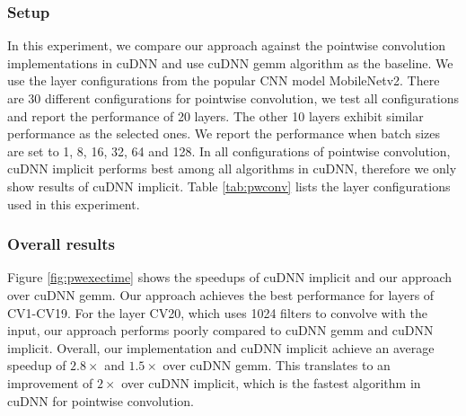 \subsubsection{Setup} In this experiment, we compare our approach against the pointwise convolution implementations in cuDNN and use cuDNN gemm algorithm as the baseline. 
We use the layer configurations from the popular CNN model MobileNetv2.
There are 30 different configurations for pointwise convolution, we test all configurations and report the performance of 20 layers. 
The other 10 layers exhibit similar performance as the selected ones.  
We report the performance when batch sizes are set to 1, 8, 16, 32, 64 and 128.
In all configurations of pointwise convolution, cuDNN implicit performs best among all algorithms in cuDNN, therefore we only show results of cuDNN implicit.
Table \ref{tab:pwconv} lists the layer configurations used in this experiment.

\subsubsection{Overall results} Figure \ref{fig:pwexectime} shows the speedups of cuDNN implicit and our approach over cuDNN gemm.
Our approach achieves the best performance for layers of CV1-CV19.
For the layer CV20, which uses 1024 filters to convolve with the input, our approach performs poorly compared to cuDNN gemm and cuDNN implicit.
Overall, our implementation and cuDNN implicit achieve an average speedup of $2.8\times$ and $1.5\times$ over cuDNN gemm. 
This translates to an improvement of $2\times$ over cuDNN implicit, which is the fastest algorithm in cuDNN for pointwise convolution.

